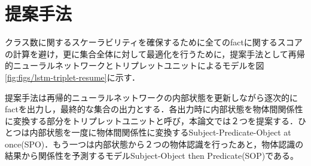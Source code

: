 \section{提案手法}
クラス数に関するスケーラビリティを確保するために全てのfactに関するスコアの計算を避け，更に集合全体に対して最適化を行うために，提案手法として再帰的ニューラルネットワークとトリプレットユニットによるモデルを図\ref{fig:figs/lstm-triplet-resume}に示す．

提案手法は再帰的ニューラルネットワークの内部状態を更新しながら逐次的にfactを出力し，最終的な集合の出力とする．各出力時に内部状態を物体間関係性に変換する部分をトリプレットユニットと呼び，本論文では２つを提案する．ひとつは内部状態を一度に物体間関係性に変換するSubject-Predicate-Object at once(SPO)．もう一つは内部状態から２つの物体認識を行ったあと，物体認識の結果から関係性を予測するモデルSubject-Object then Predicate(SOP)である。

